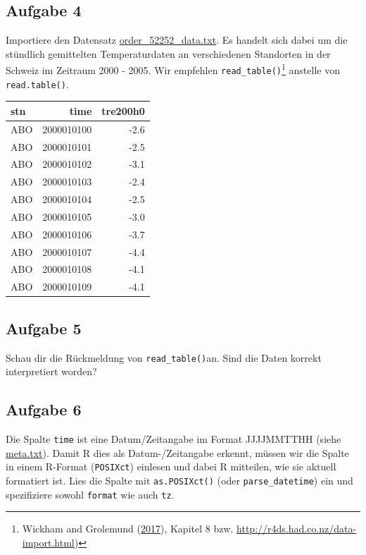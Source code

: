 \documentclass[]{book}
\let\rmarkdownfootnote\footnote%
\def\footnote{\protect\rmarkdownfootnote}
\begin{document}
\hypertarget{aufgabe-4}{%
\subsection{Aufgabe 4}\label{aufgabe-4}}

Importiere den Datensatz \href{09_PrePro1/data/order_52252_data.txt}{order\_52252\_data.txt}. Es handelt sich dabei um die stündlich gemittelten Temperaturdaten an verschiedenen Standorten in der Schweiz im Zeitraum 2000 - 2005. Wir empfehlen \texttt{read\_table()}\footnote{Wickham and Grolemund (\protect\hyperlink{ref-wickham2017}{2017}), Kapitel 8 bzw. \url{http://r4ds.had.co.nz/data-import.html})} anstelle von \texttt{read.table()}.

\begin{tabular}{l|r|r}
\hline
stn & time & tre200h0\\
\hline
ABO & 2000010100 & -2.6\\
\hline
ABO & 2000010101 & -2.5\\
\hline
ABO & 2000010102 & -3.1\\
\hline
ABO & 2000010103 & -2.4\\
\hline
ABO & 2000010104 & -2.5\\
\hline
ABO & 2000010105 & -3.0\\
\hline
ABO & 2000010106 & -3.7\\
\hline
ABO & 2000010107 & -4.4\\
\hline
ABO & 2000010108 & -4.1\\
\hline
ABO & 2000010109 & -4.1\\
\hline
\end{tabular}

\hypertarget{aufgabe-5}{%
\subsection{Aufgabe 5}\label{aufgabe-5}}

Schau dir die Rückmeldung von \texttt{read\_table()}an. Sind die Daten korrekt interpretiert worden?

\hypertarget{aufgabe-6}{%
\subsection{Aufgabe 6}\label{aufgabe-6}}

Die Spalte \texttt{time} ist eine Datum/Zeitangabe im Format JJJJMMTTHH (siehe \href{09_PrePro1/data/meta.txt}{meta.txt}). Damit R dies als Datum-/Zeitangabe erkennt, müssen wir die Spalte in einem R-Format (\texttt{POSIXct}) einlesen und dabei R mitteilen, wie sie aktuell formatiert ist. Lies die Spalte mit \texttt{as.POSIXct()} (oder \texttt{parse\_datetime}) ein und spezifiziere sowohl \texttt{format} wie auch \texttt{tz}.
\end{document}
